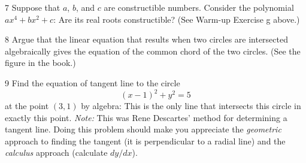 \begin{problem}{7}
    Suppose that $a$, $b$, and $c$ are constructible numbers. Consider the polynomial
    $ax^4 + bx^2 + c$: Are its real roots constructible? (See Warm-up Exercise g above.)
\end{problem}
\unsolved

\begin{problem}{8}
    Argue that the linear equation that results when two circles are intersected
    algebraically gives the equation of the common chord of the two circles. (See the
    figure in the book.)
\end{problem}
\unsolved

\begin{problem}{9}
    Find the equation of tangent line to the circle
    \[{(x - 1)}^2 + y^2 = 5\]
    at the point $(3, 1)$ by algebra: This is the only line that intersects this circle in
    exactly this point. \emph{Note:} This was Rene Descartes' method for determining a
    tangent line. Doing this problem should make you appreciate the \emph{geometric}
    approach to finding the tangent (it is perpendicular to a radial line) and the
    \emph{calculus} approach (calculate $dy/dx$).
\end{problem}
\unsolved
